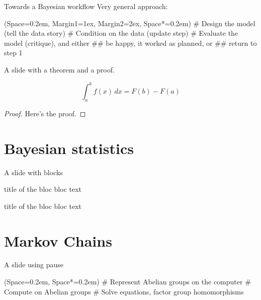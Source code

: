 \documentclass[12pt, aspectratio=149]{beamer}
\newcommand{\listSpace}{0.2em}
\theoremstyle{plain}
\begin{document}
\begin{frame}[fragile]{Towards a Bayesian workflow}
	Very general approach:
	\begin{easylist}[enumerate]
		\ListProperties(Space=\listSpace, Margin1=1ex, Margin2=2ex, Space*=\listSpace)
		# Design the model (tell the data story)
		# Condition on the data (update step)
		# Evaluate the model (critique), and either
		## be happy, it worked as planned, or
		## return to step 1
	\end{easylist}
\end{frame}

\begin{frame}[fragile]{A slide with a theorem and a proof.}
\begin{theorem}[Integral]
	\begin{equation*}
		\int_{a}^{b} f(x) \, dx = F(b) - F(a)
	\end{equation*}
\end{theorem}
\begin{proof}
Here's the proof.
\end{proof}
\end{frame}

\section{Bayesian statistics}
\begin{frame}[fragile]{A slide with blocks}
	\begin{block}{title of the bloc}
	bloc text
	\end{block}
	
	\begin{exampleblock}{title of the bloc}
	bloc text
	\end{exampleblock}
\end{frame}

\section{Markov Chains}
\begin{frame}[fragile]{A slide using pause}
	\begin{easylist}[itemize]
		\ListProperties(Space=\listSpace, Space*=\listSpace)
		# Represent Abelian groups on the computer \pause
		# Compute on Abelian groups \pause
		# Solve equations, factor group homomorphisms
	\end{easylist}
\end{frame}
\end{document}
